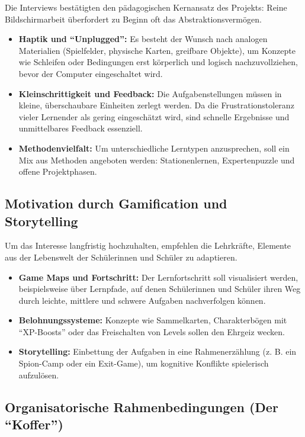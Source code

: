 \documentclass[a5paper,pagesize,10pt,bibtotoc,pointlessnumbers,
normalheadings,DIV=9,twoside=false]{scrbook}
\begin{document}
Die Interviews bestätigten den pädagogischen Kernansatz des Projekts: Reine Bildschirmarbeit überfordert zu Beginn oft das Abstraktionsvermögen.

\begin{itemize}
    \item \textbf{Haptik und ``Unplugged'':} Es besteht der Wunsch nach analogen Materialien (Spielfelder, physische Karten, greifbare Objekte), um Konzepte wie Schleifen oder Bedingungen erst körperlich und logisch nachzuvollziehen, bevor der Computer eingeschaltet wird.
    \item \textbf{Kleinschrittigkeit und Feedback:} Die Aufgabenstellungen müssen in kleine, überschaubare Einheiten zerlegt werden. Da die Frustrationstoleranz vieler Lernender als gering eingeschätzt wird, sind schnelle Ergebnisse und unmittelbares Feedback essenziell.
    \item \textbf{Methodenvielfalt:} Um unterschiedliche Lerntypen anzusprechen, soll ein Mix aus Methoden angeboten werden: Stationenlernen, Expertenpuzzle und offene Projektphasen.
\end{itemize}

\subsection*{Motivation durch Gamification und Storytelling}

Um das Interesse langfristig hochzuhalten, empfehlen die Lehrkräfte, Elemente aus der Lebenswelt der Schülerinnen und Schüler zu adaptieren.

\begin{itemize}
    \item \textbf{Game Maps und Fortschritt:} Der Lernfortschritt soll visualisiert werden, beispielsweise über Lernpfade, auf denen Schülerinnen und Schüler ihren Weg durch leichte, mittlere und schwere Aufgaben nachverfolgen können.
    \item \textbf{Belohnungssysteme:} Konzepte wie Sammelkarten, Charakterbögen mit ``XP-Boosts'' oder das Freischalten von Levels sollen den Ehrgeiz wecken.
    \item \textbf{Storytelling:} Einbettung der Aufgaben in eine Rahmenerzählung (z. B. ein Spion-Camp oder ein Exit-Game), um kognitive Konflikte spielerisch aufzulösen.
\end{itemize}

\subsection*{Organisatorische Rahmenbedingungen (Der ``Koffer'')}
\end{document}
